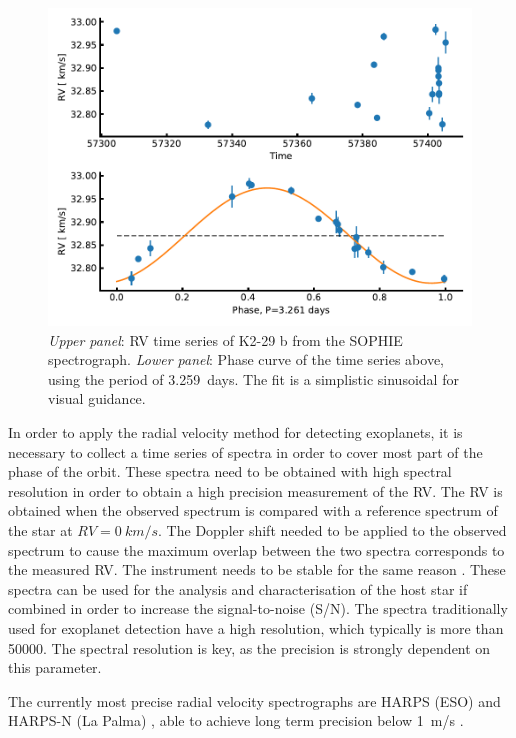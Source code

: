 \begin{figure}[htpb!]
    \centering
    \includegraphics[width=1.0\linewidth]{figures/RVmethod.pdf}
    \caption{\emph{Upper panel}: RV time series of K2-29 b from the SOPHIE spectrograph.
             \emph{Lower panel}: Phase curve of the time series above, using the period of
             \SI{3.259}{days}. The fit is a simplistic sinusoidal for visual guidance.}
    \label{fig:rvmethod}
\end{figure}

In order to apply the radial velocity method for detecting exoplanets, it is necessary to collect a
time series of spectra in order to cover most part of the phase of the orbit. These spectra need to
be obtained with high spectral resolution in order to obtain a high precision measurement of the RV.
The RV is obtained when the observed spectrum is compared with a reference spectrum of the star at
$RV=\SI{0}{km/s}$. The Doppler shift needed to be applied to the observed spectrum to cause the
maximum overlap between the two spectra corresponds to the measured RV. The instrument needs to be
stable for the same reason \citep[see e.g.][]{Bouchy2001}. These spectra can be used for the
analysis and characterisation of the host star if combined in order to increase the signal-to-noise
(S/N). The spectra traditionally used for exoplanet detection have a high resolution, which
typically is more than \num{50000}. The spectral resolution is key, as the precision is strongly
dependent on this parameter.

The currently most precise radial velocity spectrographs are HARPS (ESO) \citep{HARPS} and HARPS-N
(La Palma) \citep{HARPSN}, able to achieve long term precision below \SI{1}{m/s} \citep[see
e.g.][]{Pepe2013}.


